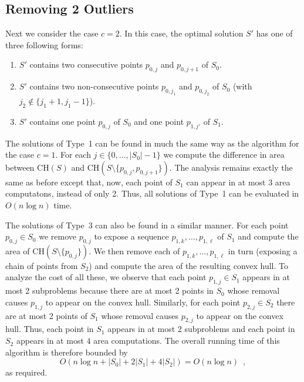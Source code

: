 \documentclass[lotsofwhite]{patmorin}
\newcommand{\ch}{\mathrm{CH}}
\begin{document}
\subsection{Removing 2 Outliers}

Next we consider the case $c=2$.  In this case, the optimal solution
$S'$ has one of three following forms:

\begin{enumerate}

\item $S'$ contains two consecutive points $p_{0,j}$ and $p_{0,j+1}$
of $S_0$.

\item $S'$ contains two non-consecutive points $p_{0,j_1}$ and
$p_{0,j_2}$ of $S_0$ (with $j_2\not\in\{j_1+1,j_1-1\}$).

\item $S'$ contains one point $p_{0,j}$ of $S_0$ and one point
$p_{1,j'}$ of $S_1$.

\end{enumerate}

The solutions of Type~1 can be found in much the same way as the
algorithm for the case $c=1$.  For each $j\in\{0,\ldots,|S_0|-1\}$ we
compute the difference in area between $\ch(S)$ and
$\ch(S\setminus\{p_{0,j},p_{0,j+1}\})$.  The analysis remains exactly
the same as before except that, now, each point of $S_1$ can appear in
at most $3$ area computatons, instead of only 2.  Thus, all solutions
of Type~1 can be evaluated in $O(n\log n)$ time.

The solutions of Type~3 can also be found in a similar manner.  For
each point $p_{0,j}\in S_0$ we remove $p_{0,j}$ to expose a sequence
$p_{1,k},\ldots,p_{1,\ell}$ of $S_1$ and compute the area of
$\ch(S\setminus\{p_{0,j}\})$.  We then remove each of
$p_{1,k},\ldots,p_{1,\ell}$ in turn (exposing a chain of points from
$S_2$) and compute the area of the resulting convex hull.  To analyze
the cost of all these, we observe that each point $p_{1,j}\in S_1$
appears in at most 2 subproblems because there are at most 2 points in
$S_0$ whose removal causes $p_{1,j}$ to appear on the convex hull.
Similarly, for each point $p_{2,j}\in S_2$ there are at most 2 points
of $S_1$ whose removal causes $p_{2,j}$ to appear on the convex hull.
Thus, each point in $S_1$ appears in at most 2 subproblems and each
point in $S_2$ appears in at most $4$ area computations.  The overall
running time of this algorithm is therefore bounded by
\[
    O\left(n\log n + |S_0| + 2|S_1| + 4|S_2|\right) = O(n\log n) \enspace ,
\]
as required.
\end{document}
